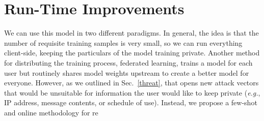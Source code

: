 \documentclass[conference]{IEEEtran}
\begin{document}



\section{Run-Time Improvements}
\label{improvements}
We can use this model in two different paradigms. In general, the idea is that the number of requisite training samples is very small, so we can run everything client-side, keeping the particulars of the model training private. Another method for distributing the training process, federated learning, trains a model for each user but routinely shares model weights upstream to create a better model for everyone. However, as we outlined in Sec.~\ref{threat}, that opens new attack vectors that would be unsuitable for information the user would like to keep private (\textit{e.g.}, IP address, message contents, or schedule of use). Instead, we propose a few-shot and online methodology for re
\end{document}
